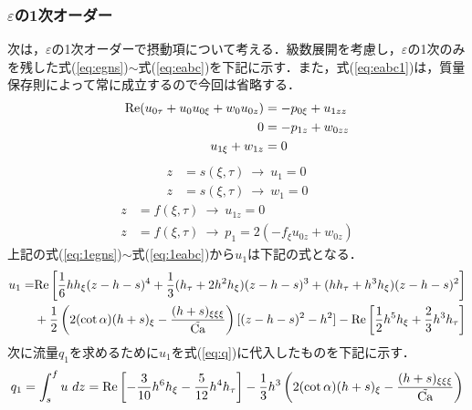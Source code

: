 \documentclass[autodetect-engine,dvipdfmx-if-dvi,ja=standard,a4paper,11pt]{bxjsarticle} %
\begin{document}
\subsubsection{$\varepsilon$の1次オーダー}
次は，$\varepsilon$の1次オーダーで摂動項について考える．級数展開を考慮し，$\varepsilon$の1次のみを残した式(\ref{eq:egns})$\sim$式(\ref{eq:eabc})を下記に示す．また，式(\ref{eq:eabc1})は，質量保存則によって常に成立するので今回は省略する．
\begin{subequations}
\begin{align}
{\rm Re}(u_{0\tau}+u_0u_{0\xi}+w_0u_{0z})&=-p_{0\xi}+u_{1zz}\label{eq:1egns1}\\
0&=-p_{1z}+w_{0zz}\label{eq:1egns2}\\
u_{1\xi}+w_{1z}&=0\label{eq:1egmass}
\end{align}
\label{eq:1egns}
\end{subequations}
\begin{subequations}
\begin{align}
z&=s(\xi,\tau)\ \rightarrow\ u_1=0\label{eq:1esbc1}\\
z&=s(\xi,\tau)\ \rightarrow\ w_1=0\label{eq:1esbc2}
\end{align}
\label{eq:1esbc}
\end{subequations}
\begin{subequations}
\begin{align}
z&=f(\xi,\tau)\ \rightarrow\ u_{1z}=0\label{eq:1eabc2}\\
z&=f(\xi,\tau)\ \rightarrow\ p_1=2(-f_\xi u_{0z}+w_{0z})\label{eq:1eabc3}
\end{align}
\label{eq:1eabc}
\end{subequations}
上記の式(\ref{eq:1egns})$\sim$式(\ref{eq:1eabc})から$u_1$は下記の式となる．
\begin{equation}
\begin{split}
u_1=&{\rm Re}\left[\frac{1}{6}hh_\xi(z-h-s)^4+\frac{1}{3}(h_\tau+2h^2h_\xi)(z-h-s)^3+(hh_\tau+h^3h_\xi)(z-h-s)^2\right]\\
&+\frac{1}{2}\left(2(\cot\alpha)(h+s)_\xi-\frac{(h+s)_{\xi\xi\xi}}{\tilde{\rm Ca}}\right)[(z-h-s)^2-h^2]-{\rm Re}\left[\frac{1}{2}h^5h_\xi+\frac{2}{3}h^3h_\tau\right]
\end{split}
\end{equation}
次に流量$q_1$を求めるために$u_1$を式(\ref{eq:q})に代入したものを下記に示す．
\begin{equation}
\begin{split}
q_1=\int^{f}_{s}u\ dz={\rm Re}\left[-\frac{3}{10}h^6h_\xi-\frac{5}{12}h^4h_\tau\right]-\frac{1}{3}h^3\left(2(\cot\alpha)(h+s)_\xi-\frac{(h+s)_{\xi\xi\xi}}{\tilde{\rm Ca}}\right)
\end{split}
\label{eq:q1}
\end{equation}
\end{document}
